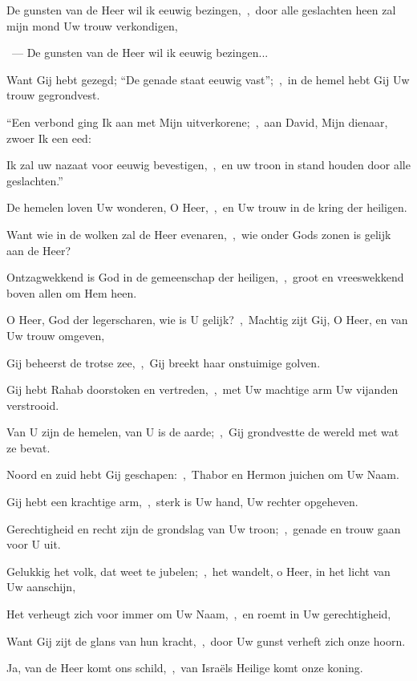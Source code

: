 \documentclass[12pt,twoside,a5paper]{article}
\begin{document}

\begin{halfparskip}

  De gunsten van de Heer wil ik eeuwig bezingen,~\sep\ door alle geslachten heen zal mijn mond Uw trouw verkondigen,

  ~---  De gunsten van de Heer wil ik eeuwig bezingen...

  Want Gij hebt gezegd; ``De genade staat eeuwig vast'';~\sep\ in de hemel hebt Gij Uw trouw gegrondvest.

  ``Een verbond ging Ik aan met Mijn uitverkorene;~\sep\ aan David, Mijn dienaar, zwoer Ik een eed:

  Ik zal uw nazaat voor eeuwig bevestigen,~\sep\ en uw troon in stand houden door alle geslachten.''
\end{halfparskip}

\begin{halfparskip}

  De hemelen loven Uw wonderen, O Heer,~\sep\ en Uw trouw in de kring der heiligen.

  Want wie in de wolken zal de Heer evenaren,~\sep\ wie onder Gods zonen is gelijk aan de Heer?

  Ontzagwekkend is God in de gemeenschap der heiligen,~\sep\ groot en vreeswekkend boven allen om Hem heen.

  O Heer, God der legerscharen, wie is U gelijk?~\sep\ Machtig zijt Gij, O Heer, en van Uw trouw omgeven,

  Gij beheerst de trotse zee,~\sep\ Gij breekt haar onstuimige golven.

  Gij hebt Rahab doorstoken en vertreden,~\sep\ met Uw machtige arm Uw vijanden verstrooid.

  Van U zijn de hemelen, van U is de aarde;~\sep\ Gij grondvestte de wereld met wat ze bevat.

  Noord en zuid hebt Gij geschapen:~\sep\ Thabor en Hermon juichen om Uw Naam.

  Gij hebt een krachtige arm,~\sep\ sterk is Uw hand, Uw rechter opgeheven.

  Gerechtigheid en recht zijn de grondslag van Uw troon;~\sep\ genade en trouw gaan voor U uit.

  Gelukkig het volk, dat weet te jubelen;~\sep\ het wandelt, o Heer, in het licht van Uw aanschijn,

  Het verheugt zich voor immer om Uw Naam,~\sep\ en roemt in Uw gerechtigheid,

  Want Gij zijt de glans van hun kracht,~\sep\ door Uw gunst verheft zich onze hoorn.

  Ja, van de Heer komt ons schild,~\sep\ van Israëls Heilige komt onze koning.
\end{halfparskip}
\end{document}

